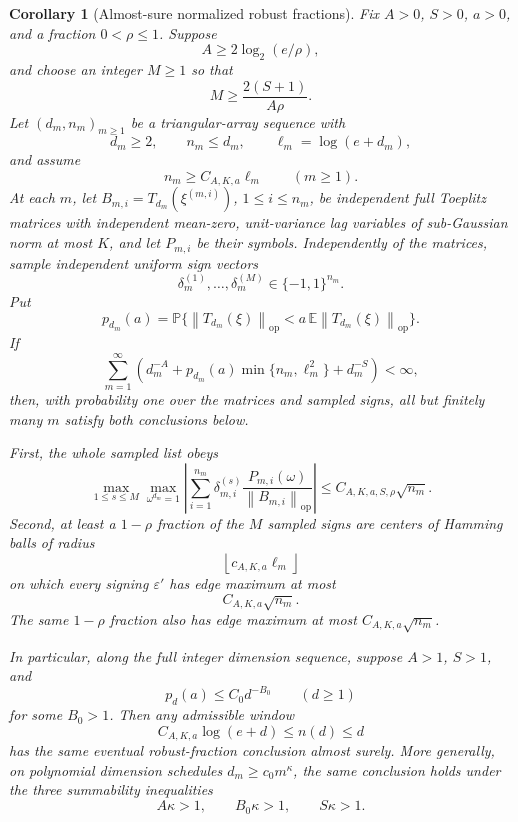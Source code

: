 \documentclass[11pt]{amsart}
\numberwithin{equation}{section}
\newtheorem{corollary}[theorem]{Corollary}
\theoremstyle{definition}
\theoremstyle{remark}
\newcommand{\op}{\mathrm{op}}
\newcommand{\Prob}{\mathbb P}
\newcommand{\Exp}{\mathbb E}
\newcommand{\norm}[1]{\left\lVert #1\right\rVert}
\newcommand{\eps}{\varepsilon}
\begin{document}
\begin{corollary}[Almost-sure normalized robust fractions]
\label{cor:normalizer-tail-borel-fractions}
Fix \(A>0\), \(S>0\), \(a>0\), and a fraction \(0<\rho\le1\).  Suppose
\[
  A\ge 2\log_2(e/\rho),
\]
and choose an integer \(M\ge1\) so that
\[
  M\ge \frac{2(S+1)}{A\rho}.
\]
Let \((d_m,n_m)_{m\ge1}\) be a triangular-array sequence with
\[
  d_m\ge2,\qquad n_m\le d_m,\qquad \ell_m=\log(e+d_m),
\]
and assume
\[
  n_m\ge C_{A,K,a}\ell_m \qquad(m\ge1).
\]
At each \(m\), let \(B_{m,i}=T_{d_m}(\xi^{(m,i)})\), \(1\le i\le n_m\), be
independent full Toeplitz matrices with independent mean-zero, unit-variance
lag variables of sub-Gaussian norm at most \(K\), and let \(P_{m,i}\) be their
symbols.  Independently of the matrices, sample independent uniform sign
vectors
\[
  \delta_m^{(1)},\ldots,\delta_m^{(M)}\in\{-1,1\}^{n_m}.
\]
Put
\[
  p_{d_m}(a)
  =\Prob\{\norm{T_{d_m}(\xi)}_{\op}
  <a\,\Exp\norm{T_{d_m}(\xi)}_{\op}\}.
\]
If
\[
  \sum_{m=1}^\infty
  \left(d_m^{-A}
  +p_{d_m}(a)\min\{n_m,\ell_m^2\}
  +d_m^{-S}\right)<\infty ,
\]
then, with probability one over the matrices and sampled signs, all but
finitely many \(m\) satisfy both conclusions below.

First, the whole sampled list obeys
\[
  \max_{1\le s\le M}\max_{\omega^{d_m}=1}
  \left|\sum_{i=1}^{n_m}\delta_{m,i}^{(s)}
  \frac{P_{m,i}(\omega)}{\norm{B_{m,i}}_{\op}}\right|
  \le C_{A,K,a,S,\rho}\sqrt{n_m}.
\]
Second, at least a \(1-\rho\) fraction of the \(M\) sampled signs are centers of
Hamming balls of radius
\[
  \left\lfloor c_{A,K,a}\ell_m\right\rfloor
\]
on which every signing \(\eps'\) has edge maximum at most
\[
  C_{A,K,a}\sqrt{n_m}.
\]
The same \(1-\rho\) fraction also has edge maximum at most
\(C_{A,K,a}\sqrt{n_m}\).

In particular, along the full integer dimension sequence, suppose \(A>1\),
\(S>1\), and
\[
  p_d(a)\le C_0d^{-B_0}\qquad(d\ge1)
\]
for some \(B_0>1\).  Then any admissible window
\[
  C_{A,K,a}\log(e+d)\le n(d)\le d
\]
has the same eventual robust-fraction conclusion almost surely.  More generally,
on polynomial dimension schedules \(d_m\ge c_0m^\kappa\), the same conclusion
holds under the three summability inequalities
\[
  A\kappa>1,\qquad B_0\kappa>1,\qquad S\kappa>1 .
\]
\end{corollary}
\end{document}
